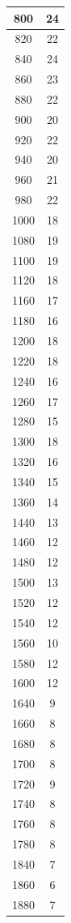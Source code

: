 \begin{table}
\begin{tabular}{|c|c|}
\hline
800	&24\\ 
\hline
820	&22\\ 
\hline
840	&24\\ 
\hline
860	&23\\ 
\hline
880	&22\\ 
\hline
900	&20\\ 
\hline
920	&22\\ 
\hline
940	&20\\ 
\hline
960	&21\\ 
\hline
980	&22\\ 
\hline
1000&	18\\ 
\hline
1080&	19\\ 
\hline	
1100&	19\\ 
\hline
1120&	18\\ 
\hline
1160&	17\\ 
\hline
1180&	16\\ 
\hline
1200&	18\\ 
\hline
1220&	18\\ 
\hline
1240&	16	\\ 
\hline
1260&	17\\ 
\hline
1280&	15\\ 
\hline
1300&	18\\ 
\hline
1320&	16\\ 
\hline
1340&	15\\ 
\hline
1360&	14\\ 
\hline
1440&	13\\ 
\hline
1460&	12\\ 
\hline
1480&	12	\\ 
\hline
1500&	13\\ 
\hline
1520&	12\\ 
\hline
1540&	12\\ 
\hline
1560&	10	\\ 
\hline
1580&	12\\ 
\hline
1600&	12\\ 
\hline
1640&	9\\ 
\hline
1660&	8\\ 
\hline
1680&	8\\ 
\hline
1700&	8\\ 
\hline
1720&	9\\ 
\hline
1740&	8\\ 
\hline
1760&	8\\ 
\hline
1780&	8\\ 
\hline
1840&	7\\ 
\hline
1860&	6\\ 
\hline
1880&	7\\ 

\end{tabular}
\end{table}
